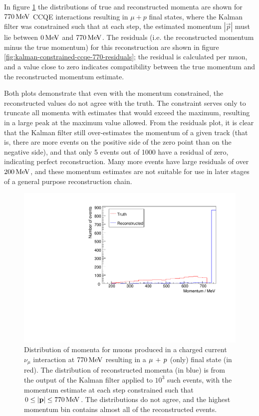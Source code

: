 In figure \ref{fig:kalman-constrained-ccqe-770} the distributions of true and reconstructed momenta are shown for $770\MeV$ CCQE interactions resulting in $\mu + p$ final states, where the Kalman filter was constrained such that at each step, the estimated momentum $|\vec{p}|$ must lie between $0\,\mathrm{MeV}$ and $770\MeV$. The residuals (i.e. the reconstructed momentum minus the true momentum) for this reconstruction are shown in figure \ref{fig:kalman-constrained-ccqe-770-residuals}; the residual is calculated per muon, and a value close to zero indicates compatibility between the true momentum and the reconstructed momentum estimate.

Both plots demonstrate that even with the momentum constrained, the reconstructed values do not agree with the truth. The constraint serves only to truncate all momenta with estimates that would exceed the maximum, resulting in a large peak at the maximum value allowed. From the residuals plot, it is clear that the Kalman filter still over-estimates the momentum of a given track (that is, there are more events on the positive side of the zero point than on the negative side), and that only 5 events out of 1000 have a residual of zero, indicating perfect reconstruction. Many more events have large residuals of over $200\,\mathrm{MeV}$, and these momentum estimates are not suitable for use in later stages of a general purpose reconstruction chain.

\begin{figure}
    \centering
    \includegraphics[angle=-90,width=\textwidth]{chapters/trackfitting_images/kalman-ccqe-low-constrained}
    \caption[True and reconstructed muon momentum distributions at $770\MeV$ (constrained)]{\label{fig:kalman-constrained-ccqe-770}Distribution of momenta for muons produced in a charged current $\nu_\mu$ interaction at $770\MeV$ resulting in a $\mu\,+\,p$ (only) final state (in red). The distribution of reconstructed momenta (in blue) is from the output of the Kalman filter applied to $10^3$ such events, with the momentum estimate at each step constrained such that $0 \le |\mathbf{p}| \le 770\,\mathrm{MeV}$. The distributions do not agree, and the highest momentum bin contains almost all of the reconstructed events.}
\end{figure}

